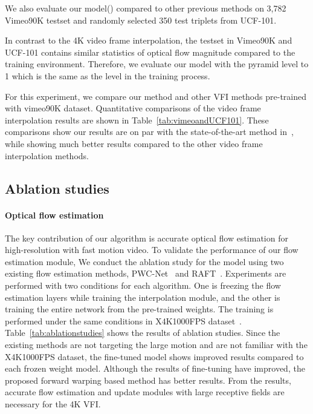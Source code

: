 \documentclass[10pt,twocolumn,letterpaper]{article}
\begin{document}
We also evaluate our model() compared to other previous methods on 3,782 Vimeo90K testset and randomly selected 350 test triplets from UCF-101.

In contrast to the 4K video frame interpolation, the testset in Vimeo90K and UCF-101 contains similar statistics of optical flow magnitude compared to the training environment.
Therefore, we evaluate our model with the pyramid level to 1 which is the same as the level in the training process.

For this experiment, we compare our method and other VFI methods pre-trained with vimeo90K dataset.
Quantitative comparisons of the video frame interpolation results are shown in Table~\ref{tab:vimeoandUCF101}.
These comparisons show our results are on par with the state-of-the-art method in~\cite{sim2021xvfi}, while showing much better results compared to the other video frame interpolation methods.

\subsection{Ablation studies}
\paragraph{Optical flow estimation}
The key contribution of our algorithm is accurate optical flow estimation for high-resolution with fast motion video.
To validate the performance of our flow estimation module, We conduct the ablation study for the model using two existing flow estimation methods, PWC-Net~\cite{sun2018pwc} and RAFT~\cite{teed2020raft}.
Experiments are performed with two conditions for each algorithm. 
One is freezing the flow estimation layers while training the interpolation module, and the other is training the entire network from the pre-trained weights. 
The training is performed under the same conditions in X4K1000FPS dataset~\cite{sim2021xvfi}. 
Table~\ref{tab:ablationstudies} shows the results of ablation studies. 
Since the existing methods are not targeting the large motion and are not familiar with the X4K1000FPS dataset, the fine-tuned model shows improved results compared to each frozen weight model. 
Although the results of fine-tuning have improved, the proposed forward warping based method has better results.
From the results, accurate flow estimation and update modules with large receptive fields are necessary for the 4K VFI.
\end{document}
